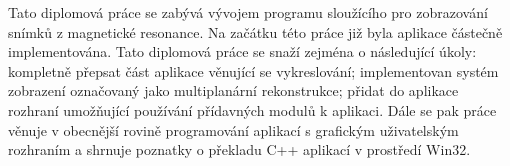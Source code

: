 Tato diplomová práce se zabývá vývojem programu sloužícího pro zobrazování snímků z magnetické resonance. Na začátku této práce již byla aplikace částečně implementována. Tato diplomová práce se snaží zejména o následující úkoly: kompletně přepsat část aplikace věnující se vykreslování; implementovan systém zobrazení označovaný jako multiplanární rekonstrukce; přidat do aplikace rozhraní umožňující používání přídavných modulů k aplikaci. Dále se pak práce věnuje v obecnější rovině programování aplikací s grafickým uživatelským rozhraním a shrnuje poznatky o překladu C++ aplikací v prostředí Win32.





